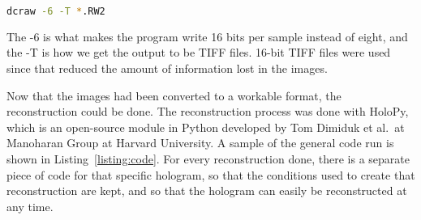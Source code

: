 \begin{center}
\begin{lstlisting}[frame=none, language=bash, numbers=none]
dcraw -6 -T *.RW2
\end{lstlisting}
\end{center}
The -6 is what makes the program write 16 bits per sample instead of eight, and
the -T is how we get the output to be TIFF files. 16-bit TIFF files were used
since that reduced the amount of information lost in the images.

Now that the images had been converted to a workable format, the
reconstruction could be done. The reconstruction process was done with HoloPy,
which is an open-source module in Python developed by Tom Dimiduk et al.\ at Manoharan Group at
Harvard University. A sample of the general code run is shown in
Listing~\ref{listing:code}. For every reconstruction done, there is a separate
piece of code for that specific hologram, so that the conditions used to create
that reconstruction are kept, and so that the hologram can easily be
reconstructed at any time.



